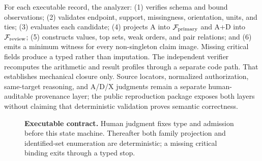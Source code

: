 For each executable record, the analyzer: (1) verifies schema and bound observations; (2) validates endpoint, support, missingness, orientation, units, and ties; (3) evaluates each candidate; (4) projects A into \(\mathcal F_{\mathrm{primary}}\) and A+D into \(\mathcal F_{\mathrm{review}}\); (5) constructs values, top sets, weak orders, and pair relations; and (6) emits a minimum witness for every non-singleton claim image.  Missing critical fields produce a typed \STOP{} rather than imputation.  The independent verifier recomputes the arithmetic and result profiles through a separate code path.  That establishes mechanical closure only.  Source locators, normalized authorization, same-target reasoning, and A/D/X judgments remain a separate human-auditable provenance layer; the public reproduction package exposes both layers without claiming that deterministic validation proves semantic correctness.

\begin{figure}[ht]
\centering
{}
\caption{\textbf{Executable contract.} Human judgment fixes type and admission before this state machine.  Thereafter both family projection and identified-set enumeration are deterministic; a missing critical binding exits through a typed stop.}
\label{fig:reviewer-contract-state-machine}
\end{figure}

